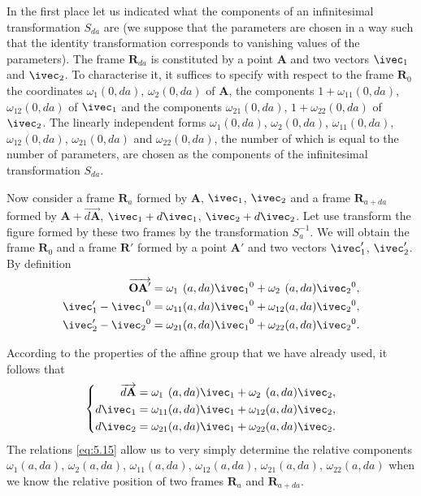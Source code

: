 In the first place let us indicated what the components of an infinitesimal transformation $S_{da}$ are (we suppose that the parameters are chosen in a way such that the identity transformation corresponds to vanishing values of the parameters). The frame $\mathbf{R}_{da}$ is constituted by a point $\mathbf{A}$ and two vectors $\ivec_{1}$ and $\ivec_{2}$. To characterise it, it suffices to specify with respect to the frame $\mathbf{R}_{0}$ the coordinates $\omega_{1}(0,da)$, $\omega_{2}(0,da)$ of $\mathbf{A}$, the components $1+\omega_{11}(0,da)$, $\omega_{12}(0,da)$ of $\ivec_{1}$ and the components $\omega_{21}(0,da)$, $1+\omega_{22}(0,da)$ of $\ivec_{2}$. The linearly independent forms $\omega_{1}(0,da)$, $\omega_{2}(0,da)$, $\omega_{11}(0,da)$, $\omega_{12}(0,da)$, $\omega_{21}(0,da)$ and $\omega_{22}(0,da)$, the number of which is equal to the number of parameters, are chosen as the components of the infinitesimal transformation $S_{da}$.

Now consider a frame $\mathbf{R}_{a}$ formed by $\mathbf{A}$, $\ivec_{1}$, $\ivec_{2}$ and a frame $\mathbf{R}_{a+da}$ formed by $\mathbf{A}+\overrightarrow{d\mathbf{A}}$, $\ivec_{1}+d\ivec_{1}$, $\ivec_{2}+d\ivec_{2}$. Let use transform the figure formed by these two frames by the transformation $S_{a}^{-1}$. We will obtain the frame $\mathbf{R}_{0}$ and a frame $\mathbf{R}'$ formed by a point $\mathbf{A}'$ and two vectors $\ivec_{1}'$, $\ivec_{2}'$. By definition
\begin{align*}
  \overrightarrow{\mathbf{OA}'}&=\omega_{1\phantom{0}}(a,da)\ivec_{1}{}^{0}+\omega_{2\phantom{0}}(a,da)\ivec_{2}{}^{0},\\
  \ivec_{1}'-\ivec_{1}{}^{0}&=\omega_{11}(a,da)\ivec_{1}{}^{0}+\omega_{12}(a,da)\ivec_{2}{}^{0},\\
  \ivec_{2}'-\ivec_{2}{}^{0}&=\omega_{21}(a,da)\ivec_{1}{}^{0}+\omega_{22}(a,da)\ivec_{2}{}^{0}.
\end{align*}

According to the properties of the affine group that we have already used, it follows that
\begin{equation}
  \label{eq:5.15}
  \left\{
    \begin{aligned}
      \overrightarrow{d\mathbf{A}}&=\omega_{1\phantom{0}}(a,da)\ivec_{1}+\omega_{2\phantom{0}}(a,da)\ivec_{2},\\
      d\ivec_{1}&=\omega_{11}(a,da)\ivec_{1}+\omega_{12}(a,da)\ivec_{2},\\
      d\ivec_{2}&=\omega_{21}(a,da)\ivec_{1}+\omega_{22}(a,da)\ivec_{2}.
    \end{aligned}
  \right.
\end{equation}
The relations \eqref{eq:5.15} allow us to very simply determine the relative components $\omega_{1}(a,da)$, $\omega_{2}(a,da)$, $\omega_{11}(a,da)$, $\omega_{12}(a,da)$, $\omega_{21}(a,da)$, $\omega_{22}(a,da)$ when we know the relative position of two frames $\mathbf{R}_{a}$ and $\mathbf{R}_{a+da}$.



